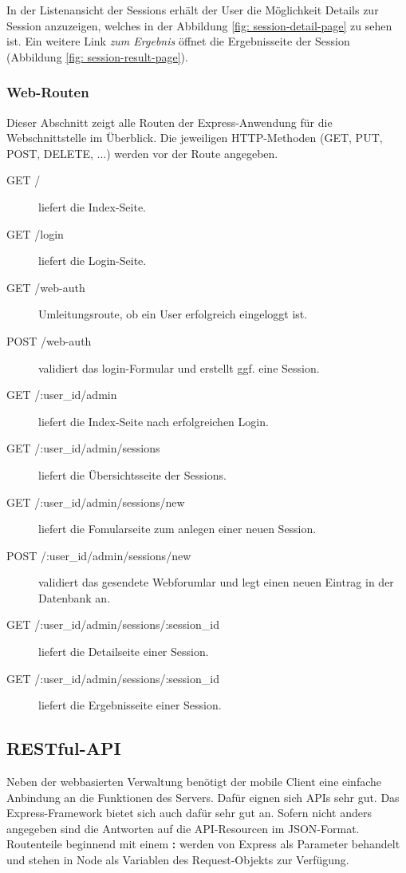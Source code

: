 In der Listenansicht der Sessions erhält der User die Möglichkeit Details zur Session anzuzeigen, welches in der Abbildung \ref{fig: session-detail-page} zu sehen ist. 
Ein weitere Link \emph{zum Ergebnis} öffnet die Ergebnisseite der Session (Abbildung \ref{fig: session-result-page}).

\subsubsection{Web-Routen}

Dieser Abschnitt zeigt alle Routen der Express-Anwendung für die Webschnittstelle im Überblick. 
Die jeweiligen \ac{HTTP}-Methoden (GET, PUT, POST, DELETE, ...) werden vor der Route angegeben.

\begin{description}

	\item[GET /] liefert die Index-Seite.
	\item[GET /login] liefert die Login-Seite.

	\item[GET /web-auth] Umleitungsroute, ob ein User erfolgreich eingeloggt ist.
	\item[POST /web-auth] validiert das login-Formular und erstellt ggf. eine Session.
	\item[GET /:user\_id/admin] liefert die Index-Seite nach erfolgreichen Login.
	\item[GET /:user\_id/admin/sessions] liefert die Übersichtsseite der Sessions.
	\item[GET /:user\_id/admin/sessions/new] liefert die Fomularseite zum anlegen einer neuen Session.
	\item[POST /:user\_id/admin/sessions/new] validiert das gesendete Webforumlar und legt einen neuen Eintrag in der Datenbank an.
	\item[GET /:user\_id/admin/sessions/:session\_id] liefert die Detailseite einer Session.
	\item[GET /:user\_id/admin/sessions/:session\_id] liefert die Ergebnisseite einer Session.
	
	
\end{description}

\subsection{RESTful-API \label{sec: api}}

Neben der webbasierten Verwaltung benötigt der mobile Client eine einfache Anbindung an die Funktionen des Servers. 
Dafür eignen sich \ac{API}s sehr gut. 
Das Express-Framework bietet sich auch dafür sehr gut an. 
Sofern nicht anders angegeben sind die Antworten auf die \ac{API}-Resourcen im \ac{JSON}-Format. 
Routenteile beginnend mit einem \textbf{:} werden von Express als Parameter behandelt und stehen in Node als Variablen des Request-Objekts zur Verfügung. 

